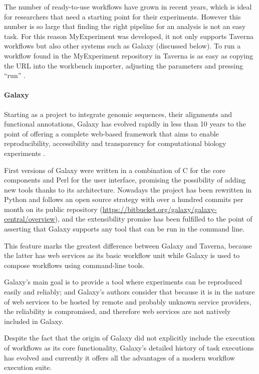 The number of ready-to-use workflows have grown in recent years, which is ideal for researchers that need a starting point for their experiments. However this number is so large that finding the right pipeline for an analysis is not an easy task. For this reason MyExperiment was developed, it not only supports Taverna workflows but also other systems such as Galaxy (discussed below). To run a workflow found in the MyExperiment repository in Taverna is as easy as copying the URL into the workbench importer, adjusting the parameters and pressing ``run'' \cite{WOL2013}.

\paragraph{Galaxy}
Starting as a project to integrate genomic sequences, their alignments and functional annotations, Galaxy has evolved rapidly in less than 10 years to the point of offering a complete web-based framework that aims to enable reproducibility, accessibility and transparency for computational biology experiments \cite{GIA2005, GOE2010}.

First versions of Galaxy were written in a combination of C for the core components and Perl for the user interface, promising the possibility of adding new tools thanks to its architecture. Nowadays the project has been rewritten in Python and follows an open source strategy with over a hundred commits per month on its public repository (\url{https://bitbucket.org/galaxy/galaxy-central/overview}), and the extensibility promise has been fulfilled to the point of asserting that Galaxy supports any tool that can be run in the command line.

This feature marks the greatest difference between Galaxy and Taverna, because the latter has web services as its basic workflow unit while Galaxy is used to compose workflows using command-line tools.

Galaxy's main goal is to provide a tool where experiments can be reproduced easily and reliably; and Galaxy's authors consider that because it is in the nature of web services to be hosted by remote and probably unknown service providers, the reliability is compromised, and therefore web services are not natively included in Galaxy.

Despite the fact that the origin of Galaxy did not explicitly include the execution of workflows as its core functionality, Galaxy's detailed history of task executions has evolved and currently it offers all the advantages of a modern workflow execution suite.

